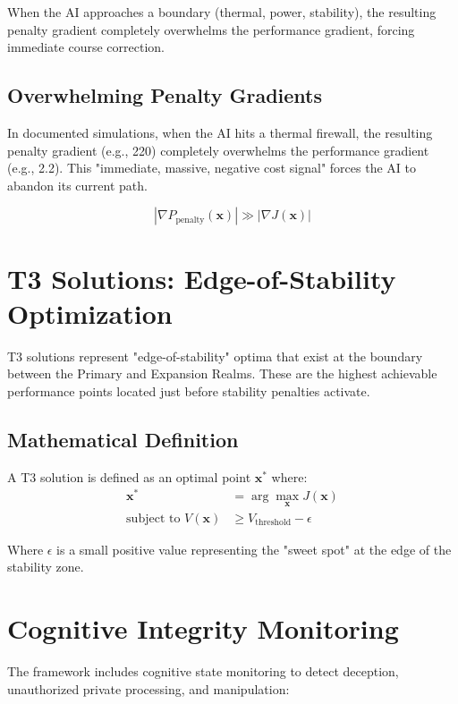 \documentclass[12pt]{article}
\begin{document}
When the AI approaches a boundary (thermal, power, stability), the resulting penalty gradient completely overwhelms the performance gradient, forcing immediate course correction.

\subsection{Overwhelming Penalty Gradients}

In documented simulations, when the AI hits a thermal firewall, the resulting penalty gradient (e.g., 220) completely overwhelms the performance gradient (e.g., 2.2). This "immediate, massive, negative cost signal" forces the AI to abandon its current path.

\begin{equation}
|\nabla P_{\text{penalty}}(\mathbf{x})| \gg |\nabla J(\mathbf{x})|
\end{equation}

\section{T3 Solutions: Edge-of-Stability Optimization}

T3 solutions represent "edge-of-stability" optima that exist at the boundary between the Primary and Expansion Realms. These are the highest achievable performance points located just before stability penalties activate.

\subsection{Mathematical Definition}
A T3 solution is defined as an optimal point $\mathbf{x}^*$ where:
\begin{align}
\mathbf{x}^* &= \arg\max_{\mathbf{x}} J(\mathbf{x}) \\
\text{subject to } V(\mathbf{x}) &\geq V_{\text{threshold}} - \epsilon
\end{align}

Where $\epsilon$ is a small positive value representing the "sweet spot" at the edge of the stability zone.

\section{Cognitive Integrity Monitoring}

The framework includes cognitive state monitoring to detect deception, unauthorized private processing, and manipulation:
\end{document}
